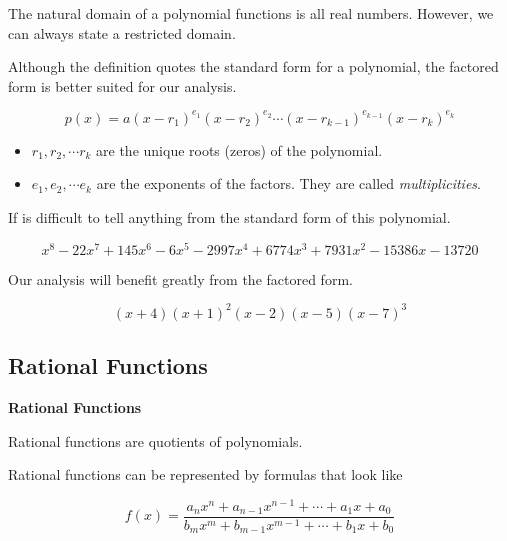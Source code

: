 \documentclass{ximera}
\begin{document}
The natural domain of a polynomial functions is all real numbers.  However, we can always state a restricted domain.




Although the definition quotes the standard form for a polynomial, the factored form is better suited for our analysis.

\[
p(x) = a (x - r_1)^{e_1} (x - r_2)^{e_2} \cdots (x - r_{k-1})^{e_{k-1}} (x - r_k)^{e_k}  
\]


\begin{itemize}
\item $r_1, r_2, \cdots r_k$ are the unique roots (zeros) of the polynomial.
\item $e_1, e_2, \cdots e_k$ are the exponents of the factors. They are called \textit{multiplicities}.
\end{itemize}



\begin{example}

If is difficult to tell anything from the standard form of this polynomial.

\[
x^8 - 22 x^7 +145 x^6 - 6 x^5 - 2997 x^4 + 6774 x^3 + 7931 x^2 - 15386 x - 13720
\]



Our analysis will benefit greatly from the factored form.


\[
(x+4) (x+1)^2 (x-2) (x-5) (x-7)^3
\]




\end{example}




















\subsection*{Rational Functions}




\begin{template}  \textbf{\textcolor{blue!55!black}{Rational Functions}} 



Rational functions are quotients of polynomials. 


Rational functions can be represented by formulas that look like


\[ 
f(x) = \frac{ a_n x^n + a_{n-1} x^{n-1} + \cdots + a_1 x + a_0 } {b_m x^m + b_{m-1} x^{m-1} + \cdots + b_1 x + b_0}
\]






\end{template}
\end{document}
